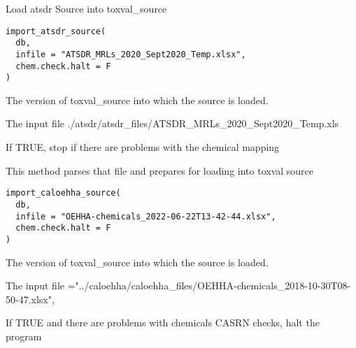 \documentclass[letterpaper]{book}
\begin{document}
%
\begin{Description}\relax
Load atsdr Source into toxval\_source
\end{Description}
%
\begin{Usage}
\begin{verbatim}
import_atsdr_source(
  db,
  infile = "ATSDR_MRLs_2020_Sept2020_Temp.xlsx",
  chem.check.halt = F
)
\end{verbatim}
\end{Usage}
%
\begin{Arguments}
\begin{ldescription}
\item[\code{db}] The version of toxval\_source into which the source is loaded.

\item[\code{infile}] The input file ./atsdr/atsdr\_files/ATSDR\_MRLs\_2020\_Sept2020\_Temp.xls

\item[\code{chem.check.halt}] If TRUE, stop if there are problems with the chemical mapping
\end{ldescription}
\end{Arguments}
%
\begin{Description}\relax
This method parses that file and prepares for loading into toxval source
\end{Description}
%
\begin{Usage}
\begin{verbatim}
import_caloehha_source(
  db,
  infile = "OEHHA-chemicals_2022-06-22T13-42-44.xlsx",
  chem.check.halt = F
)
\end{verbatim}
\end{Usage}
%
\begin{Arguments}
\begin{ldescription}
\item[\code{db}] The version of toxval\_source into which the source is loaded.

\item[\code{infile}] The input file ="../caloehha/caloehha\_files/OEHHA-chemicals\_2018-10-30T08-50-47.xlsx",

\item[\code{chem.check.halt}] If TRUE and there are problems with chemicals CASRN checks, halt the program
\end{ldescription}
\end{Arguments}
\end{document}

